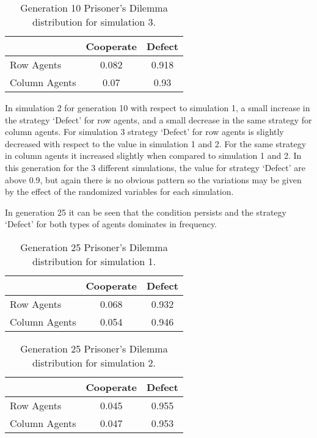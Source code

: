 \begin{table}[H]
\begin{center}
\begin{tabular}{|l|c|c|}
\hline
& Cooperate & Defect \\ 
\hline
Row Agents & 0.082 & 0.918\\
\hline
Column Agents & 0.07 & 0.93\\
\hline
\end{tabular}
\end{center}
\caption{Generation 10 Prisoner’s Dilemma distribution for simulation 3.}
\label{tab:pds3g10}
\end{table}

In simulation 2 for generation 10  with respect to simulation 1, a small increase in the strategy `Defect'  for row agents, and a small decrease in the same strategy for column agents. For simulation 3 strategy `Defect' for row agents is slightly decreased with respect to the value in simulation 1 and 2. For the same strategy in column agents it increased slightly when compared to simulation 1 and 2.
In this generation for the 3 different simulations, the value for strategy `Defect' are above 0.9, but again there is no obvious pattern so the variations may be given by the effect of the randomized variables for each simulation.

In generation 25 it can be seen that the condition persists and the strategy `Defect' for both types of agents dominates in frequency.
\begin{table}[H]
\begin{center}
\begin{tabular}{|l|c|c|}
\hline
& Cooperate & Defect \\ 
\hline
Row Agents & 0.068 & 0.932\\
\hline
Column Agents & 0.054 & 0.946\\
\hline
\end{tabular}
\end{center}
\caption{Generation 25 Prisoner’s Dilemma distribution for simulation 1.}
\label{tab:pds1g25}
\end{table}

\begin{table}[H]
\begin{center}
\begin{tabular}{|l|c|c|}
\hline
& Cooperate & Defect \\ 
\hline
Row Agents & 0.045 & 0.955\\
\hline
Column Agents & 0.047 & 0.953\\
\hline
\end{tabular}
\end{center}
\caption{Generation 25 Prisoner’s Dilemma distribution for simulation 2.}
\label{tab:pds2g25}
\end{table}

